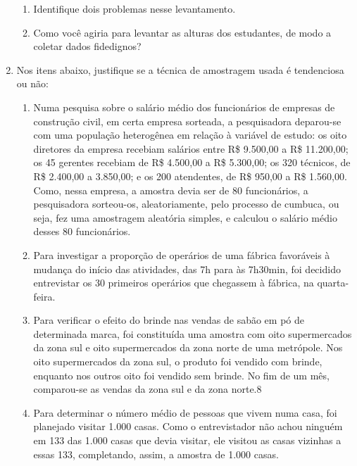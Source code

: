 \begin{enumerate}[label=\emph{\arabic*})]
\begin{enumerate}[label=\emph{\alph*})]
		      \item Identifique dois problemas nesse levantamento.

		      \item Como você agiria para levantar as alturas dos estudantes, de modo a coletar dados
		            fidedignos?

	      \end{enumerate}

	\item Nos itens abaixo, justifique se a técnica de amostragem usada é tendenciosa ou não:

	      \begin{enumerate}[label=\emph{\alph*})]

		      \item Numa pesquisa sobre o salário médio dos funcionários de empresas de construção
		            civil, em certa empresa sorteada, a pesquisadora deparou-se com uma população
		            heterogênea em relação à variável de estudo: os oito diretores da empresa recebiam
		            salários entre R\$ 9.500,00 a R\$ 11.200,00; os 45 gerentes recebiam de R\$ 4.500,00
		            a R\$ 5.300,00; os 320 técnicos, de R\$ 2.400,00 a 3.850,00; e os 200 atendentes, de
		            R\$ 950,00 a R\$ 1.560,00. Como, nessa empresa, a amostra devia ser de 80
		            funcionários, a pesquisadora sorteou-os, aleatoriamente, pelo processo de
		            cumbuca, ou seja, fez uma amostragem aleatória simples, e calculou o salário médio
		            desses 80 funcionários.

		      \item Para investigar a proporção de operários de uma fábrica favoráveis à mudança do
		            início das atividades, das 7h para às 7h30min, foi decidido entrevistar os 30 primeiros
		            operários que chegassem à fábrica, na quarta-feira.

		      \item Para verificar o efeito do brinde nas vendas de sabão em pó de determinada marca,
		            foi constituída uma amostra com oito supermercados da zona sul e oito
		            supermercados da zona norte de uma metrópole. Nos oito supermercados da zona
		            sul, o produto foi vendido com brinde, enquanto nos outros oito foi vendido sem
		            brinde. No fim de um mês, comparou-se as vendas da zona sul e da zona norte.8

		      \item Para determinar o número médio de pessoas que vivem numa casa, foi planejado
		            visitar 1.000 casas. Como o entrevistador não achou ninguém em 133 das 1.000
		            casas que devia visitar, ele visitou as casas vizinhas a essas 133, completando,
		            assim, a amostra de 1.000 casas.


\end{enumerate}
\end{enumerate}
